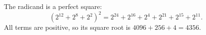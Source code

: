 The radicand is a perfect square:
\[
(2^{12}+2^8+2^2)^2
=2^{24}+2^{16}+2^4+2^{21}+2^{15}+2^{11}.
\]
All terms are positive, so its square root is $\boxed{4096+256+4=4356}$.
